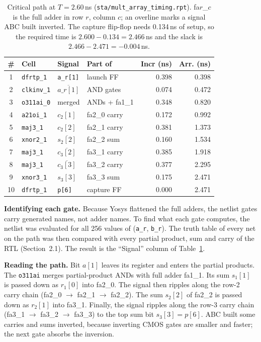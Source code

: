 \documentclass[10pt,a4paper,twocolumn]{article}
\begin{document}
\begin{table}[!htbp]
\centering\footnotesize
\begin{tabular}{cllp{1.75cm}rr}
\toprule
\textbf{\#} & \textbf{Cell} & \textbf{Signal} & \textbf{Part of} & \textbf{Incr (ns)} & \textbf{Arr. (ns)} \\
\midrule
1 & \texttt{dfrtp\_1} & \texttt{a\_r[1]} & launch FF & 0.398 & 0.398 \\
2 & \texttt{clkinv\_1} & $\overline{a\_r[1]}$ & AND gates & 0.074 & 0.472 \\
3 & \texttt{o311ai\_0} & merged & ANDs + fa1\_1 & 0.348 & 0.820 \\
4 & \texttt{a21oi\_1} & $c_2[1]$ & fa2\_0 carry & 0.172 & 0.992 \\
5 & \texttt{maj3\_1} & $c_2[2]$ & fa2\_1 carry & 0.381 & 1.373 \\
6 & \texttt{xnor2\_1} & $\overline{s_2[2]}$ & fa2\_2 sum & 0.160 & 1.534 \\
7 & \texttt{maj3\_1} & $\overline{c_3[2]}$ & fa3\_1 carry & 0.385 & 1.918 \\
8 & \texttt{maj3\_1} & $\overline{c_3[3]}$ & fa3\_2 carry & 0.377 & 2.295 \\
9 & \texttt{xnor3\_1} & $s_3[3]$ & fa3\_3 sum & 0.175 & 2.471 \\
10 & \texttt{dfrtp\_1} & \texttt{p[6]} & capture FF & 0.000 & 2.471 \\
\bottomrule
\end{tabular}
\caption{Critical path at $T = 2.60$\,ns (\texttt{sta/mult\_array\_timing.rpt}). fa$r$\_$c$ is the full adder in row $r$, column $c$; an overline marks a signal ABC built inverted. The capture flip-flop needs 0.134\,ns of setup, so the required time is $2.600 - 0.134 = 2.466$\,ns and the slack is $2.466 - 2.471 = -0.004$\,ns.}
\label{tab:path}
\end{table}

\textbf{Identifying each gate.} Because Yosys flattened the full adders, the netlist gates carry generated names, not adder names. To find what each gate computes, the netlist was evaluated for all 256 values of (\texttt{a\_r}, \texttt{b\_r}). The truth table of every net on the path was then compared with every partial product, sum and carry of the RTL (Section~2.1). The result is the ``Signal'' column of Table~\ref{tab:path}.

\textbf{Reading the path.} Bit $a[1]$ leaves its register and enters the partial products. The \texttt{o311ai} merges partial-product ANDs with full adder fa1\_1. Its sum $s_1[1]$ is passed down as $r_1[0]$ into fa2\_0. The signal then ripples along the row-2 carry chain (fa2\_0 $\to$ fa2\_1 $\to$ fa2\_2). The sum $s_2[2]$ of fa2\_2 is passed down as $r_2[1]$ into fa3\_1. Finally, the signal ripples along the row-3 carry chain (fa3\_1 $\to$ fa3\_2 $\to$ fa3\_3) to the top sum bit $s_3[3] = p[6]$. ABC built some carries and sums inverted, because inverting CMOS gates are smaller and faster; the next gate absorbs the inversion.
\end{document}
